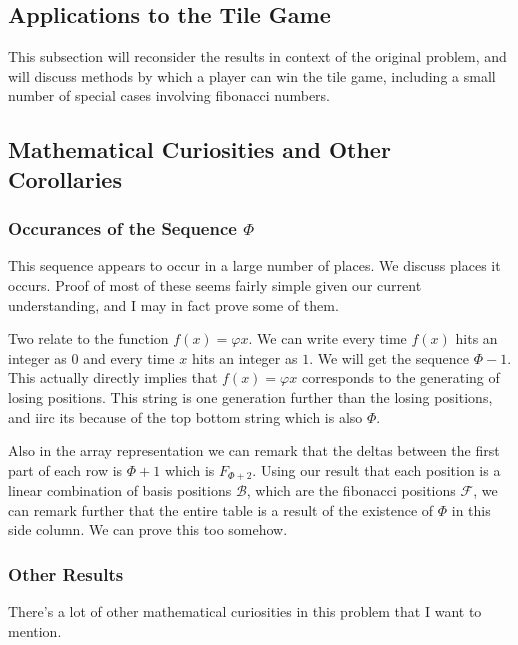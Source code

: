 \documentclass[11pt, letterpaper]{article}
\begin{document}
\subsection{Applications to the Tile Game}
This subsection will reconsider the results in context of the original problem, and will discuss methods by which a player can win the tile game, including a small number of special cases involving fibonacci numbers.
\subsection{Mathematical Curiosities and Other Corollaries}
\subsubsection{Occurances of the Sequence $\Phi $}
This sequence appears to occur in a large number of places. We discuss places it occurs. Proof of most of these seems fairly simple given our current understanding, and I may in fact prove some of them.

Two relate to the function $f(x)=\varphi x$. We can write every time $f(x)$ hits an integer as $0$ and every time $x$ hits an integer as $1$. We will get the sequence $\Phi -1$. This actually directly implies that $f(x)=\varphi x$ corresponds to the generating of losing positions. This string is one generation further than the losing positions, and iirc its because of the top bottom string which is also $\Phi $.

Also in the array representation we can remark that the deltas between the first part of each row is $\Phi +1$ which is $F_{\Phi +2}$. Using our result  that each position is a linear combination of basis positions $\mathcal{B} $, which are the fibonacci positions $\mathcal{F} $, we can remark further that the entire table is a result of the existence  of $\Phi  $ in this side column. We can prove this too somehow.
\subsubsection{Other Results}
There's a lot of other mathematical curiosities in this problem that I want to mention.
\end{document}
